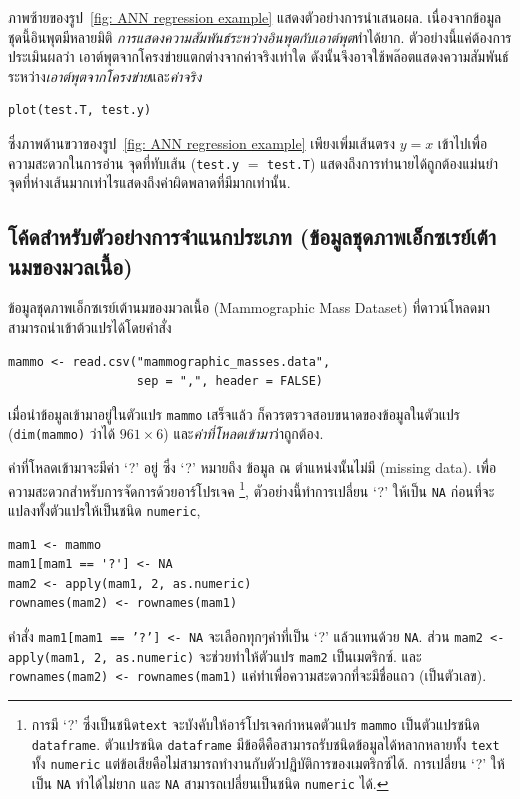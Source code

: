 ภาพซ้ายของรูป~\ref{fig: ANN regression example} 
แสดงตัวอย่างการนำเสนอผล.
เนื่องจากข้อมูลชุดนี้อินพุตมีหลายมิติ \textit{การแสดงความสัมพันธ์ระหว่างอินพุตกับเอาต์พุต}ทำได้ยาก.
ตัวอย่างนี้แค่ต้องการประเมินผลว่า เอาต์พุตจากโครงข่ายแตกต่างจากค่าจริงเท่าใด
ดังนั้นจึงอาจใช้พล๊อตแสดงความสัมพันธ์ระหว่าง\textit{เอาต์พุตจากโครงข่าย}และ\textit{ค่าจริง} 
\begin{verbatim}
plot(test.T, test.y)
\end{verbatim}
ซึ่งภาพด้านขวาของรูป~\ref{fig: ANN regression example} เพียงเพิ่มเส้นตรง $y = x$ เข้าไปเพื่อความสะดวกในการอ่าน
จุดที่ทับเส้น (\texttt{test.y} $=$ \texttt{test.T}) แสดงถึงการทำนายได้ถูกต้องแม่นยำ
จุดที่ห่างเส้นมากเท่าไรแสดงถึงค่าผิดพลาดที่มีมากเท่านั้น.

\subsection{โค้ดสำหรับตัวอย่างการจำแนกประเภท (ข้อมูลชุดภาพเอ็กซเรย์เต้านมของมวลเนื้อ)}
\label{sec: ann app biclass example code}

ข้อมูลชุดภาพเอ็กซเรย์เต้านมของมวลเนื้อ (Mammographic Mass Dataset) ที่ดาวน์โหลดมา สามารถนำเข้าต้วแปรได้โดยคำสั่ง
\begin{verbatim}
mammo <- read.csv("mammographic_masses.data", 
                  sep = ",", header = FALSE)
\end{verbatim}
เมื่อนำข้อมูลเข้ามาอยู่ในตัวแปร \texttt{mammo} เสร็จแล้ว 
ก็ควรตรวจสอบขนาดของข้อมูลในตัวแปร (\texttt{dim(mammo)} ว่าได้ $961 \times 6$) 
และ\textit{ค่าที่โหลดเข้ามา}ว่าถูกต้อง.

ค่าที่โหลดเข้ามาจะมีค่า `?' อยู่ 
ซึ่ง `?' หมายถึง ข้อมูล ณ ตำแหน่งนั้นไม่มี (missing data).
เพื่อความสะดวกสำหรับการจัดการด้วยอาร์โปรเจค%
\footnote{%
การมี `?' ซึ่งเป็นชนิด\texttt{text} จะบังคับให้อาร์โปรเจคกำหนดตัวแปร \texttt{mammo} เป็นตัวแปรชนิด \texttt{dataframe}.
ตัวแปรชนิด \texttt{dataframe} มีข้อดีคือสามารถรับชนิดข้อมูลได้หลากหลายทั้ง \texttt{text} ทั้ง \texttt{numeric}
แต่ข้อเสียคือไม่สามารถทำงานกับตัวปฏิบัติการของเมตริกซ์ได้.
การเปลี่ยน `?' ให้เป็น \texttt{NA} ทำได้ไม่ยาก
และ \texttt{NA} สามารถเปลี่ยนเป็นชนิด \texttt{numeric} ได้.
}, ตัวอย่างนี้ทำการเปลี่ยน `?' ให้เป็น \texttt{NA}
ก่อนที่จะแปลงทั้งตัวแปรให้เป็นชนิด \texttt{numeric},
\begin{verbatim}
mam1 <- mammo
mam1[mam1 == '?'] <- NA
mam2 <- apply(mam1, 2, as.numeric)
rownames(mam2) <- rownames(mam1)
\end{verbatim}

คำสั่ง \texttt{mam1[mam1 == '?'] <- NA} จะเลือกทุกๆค่าที่เป็น `?' แล้วแทนด้วย \texttt{NA}.
ส่วน \texttt{mam2 <- apply(mam1, 2, as.numeric)} จะช่วยทำให้ตัวแปร \texttt{mam2} เป็นเมตริกซ์.
และ \texttt{rownames(mam2) <- rownames(mam1)} แค่ทำเพื่อความสะดวกที่จะมีชื่อแถว (เป็นตัวเลข).

